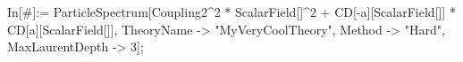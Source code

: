 In[#]:= ParticleSpectrum[Coupling2^2 * ScalarField[]^2 + CD[-a][ScalarField[]] * CD[a][ScalarField[]], TheoryName -> "MyVeryCoolTheory", Method -> "Hard", MaxLaurentDepth -> 3]; 